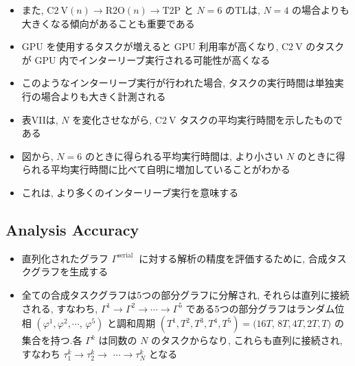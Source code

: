\begin{frame}{}
    \begin{itemize}
        \item また, $\mathrm{C} 2 \mathrm{~V}(n) \rightarrow \mathrm{R} 2 \mathrm{O}(n) \rightarrow \mathrm{T} 2 \mathrm{P}$ と $N=6$ のTLは, $N=4$ の場合よりも大きくなる傾向があることも重要である
\item GPU を使用するタスクが増えると GPU 利用率が高くなり, $\mathrm{C} 2 \mathrm{~V}$ のタスクが GPU 内でインターリーブ実行される可能性が高くなる
\item このようなインターリーブ実行が行われた場合, タスクの実行時間は単独実行の場合よりも大きく計測される
\item 表VIIは, $N$ を変化させながら, $\mathrm{C} 2 \mathrm{~V}$ タスクの平均実行時間を示したものである
\item 図から, $N=6$ のときに得られる平均実行時間は, より小さい $N$ のときに得られる平均実行時間に比べて自明に増加していることがわかる
\item これは, より多くのインターリーブ実行を意味する
    \end{itemize}
\end{frame}


\subsection{Analysis Accuracy}
\label{ssec: analysis accuracy}

\begin{frame}{}
    \begin{itemize}
        \item 直列化されたグラフ $\Gamma^{\text {serial }}$ に対する解析の精度を評価するために, 合成タスクグラフを生成する
\item 全ての合成タスクグラフは5つの部分グラフに分解され, それらは直列に接続される, すなわち, $\Gamma^{1} \rightarrow \Gamma^{2} \rightarrow \cdots \rightarrow \Gamma^{5}$ である5つの部分グラフはランダム位相 $\left(\varphi^{1}, \varphi^{2}, \cdots\right.$, $\left.\varphi^{5}\right)$ と調和周期 $\left(T^{1}, T^{2}, T^{3}, T^{4}, T^{5}\right)=(16 T$, $8 T, 4 T, 2 T, T)$ の集合を持つ.各 $\Gamma^{k}$ は同数の $N$ のタスクからなり, これらも直列に接続され, すなわち $\tau_{1}^{k} \rightarrow \tau_{2}^{k} \rightarrow$  $\cdots \rightarrow \tau_{N}^{k}$ となる
    \end{itemize}
\end{frame}

